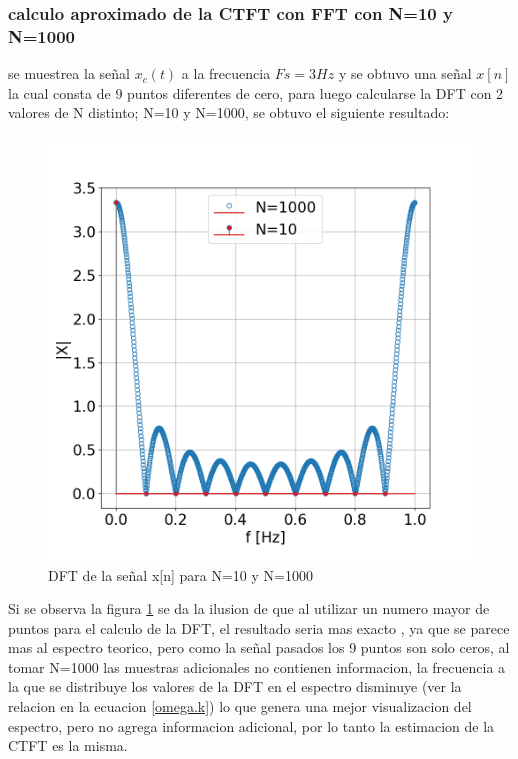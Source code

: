 \documentclass[letterpaper]{article}
\begin{document}
\subsubsection*{calculo aproximado de la CTFT con FFT con N=10 y N=1000}
se muestrea la señal $x_{c}(t)$ a la frecuencia $Fs=3 Hz$ y se obtuvo una señal $x[n]$ la cual consta de 9 puntos diferentes de cero, para luego calcularse la DFT con 2 valores de N distinto; N=10 y N=1000, se obtuvo el siguiente resultado:
\begin{figure}
\centering
    \includegraphics[width=\textwidth]{Img/punto_4_e.png}
    \caption{DFT de la señal x[n] para N=10 y N=1000}
    \label{fig.4e}
\end{figure} 
Si se observa la figura \ref{fig.4e} se da la ilusion de que al utilizar un numero mayor de puntos para el calculo de la DFT, el resultado seria mas exacto , ya que se parece mas al espectro teorico, pero como la señal pasados los 9 puntos son solo ceros, al tomar N=1000 las muestras adicionales no contienen informacion, la frecuencia a la que se distribuye los valores de la DFT en el espectro disminuye (ver la relacion en la ecuacion \ref{omega.k})
lo que genera una mejor visualizacion del espectro, pero no agrega informacion adicional, por lo tanto la estimacion de la CTFT es la misma.
\end{document}
